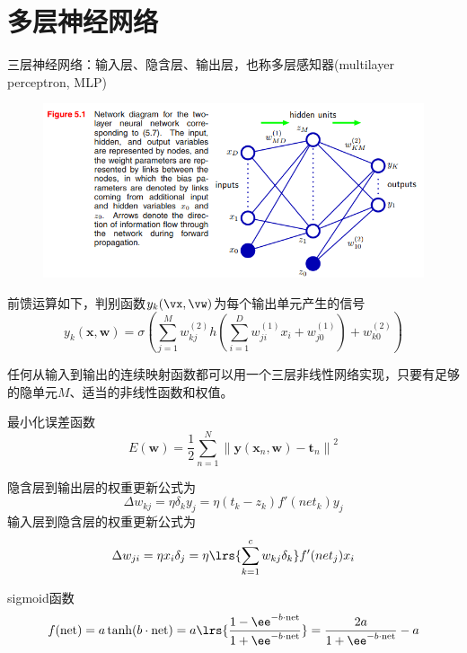
\section{多层神经网络} %
三层神经网络：输入层、隐含层、输出层，也称多层感知器(multilayer perceptron, MLP)
\begin{figure}[H]
\centering
\includegraphics[width=0.8\linewidth]{fig/forward_propagation.png}
\end{figure}

前馈运算如下，判别函数$y_k(\vx,\vw)$为每个输出单元产生的信号
\[y_{k}(\mathbf{x}, \mathbf{w})=\sigma\left(\sum_{j=1}^{M} w_{k j}^{(2)} h\left(\sum_{i=1}^{D} w_{j i}^{(1)} x_{i}+w_{j 0}^{(1)}\right)+w_{k 0}^{(2)}\right)\]

任何从输入到输出的连续映射函数都可以用一个三层非线性网络实现，只要有足够的隐单元$M$、适当的非线性函数和权值。

最小化误差函数
\[E(\mathbf{w})=\frac{1}{2} \sum_{n=1}^{N}\left\|\mathbf{y}\left(\mathbf{x}_{n}, \mathbf{w}\right)-\mathbf{t}_{n}\right\|^{2}\]

隐含层到输出层的权重更新公式为
\[\Delta w_{kj}=\eta\delta_k y_j=\eta(t_k-z_k)f'(net_k)y_j\]
输入层到隐含层的权重更新公式为
\[\Delta w_{ji}=\eta x_i\delta_j=\eta\lrs{\sum_{k=1}^c w_{kj}\delta_k}f'(net_j)x_i\]

sigmoid函数
\[f(\text{net})=a\tanh(b\cdot\text{net})=a\lrs{\frac{1-\ee^{-b\cdot \text{net}}}{1+\ee^{-b\cdot\text{net}}}}=\frac{2a}{1+\ee^{-b\cdot\text{net}}}-a\]